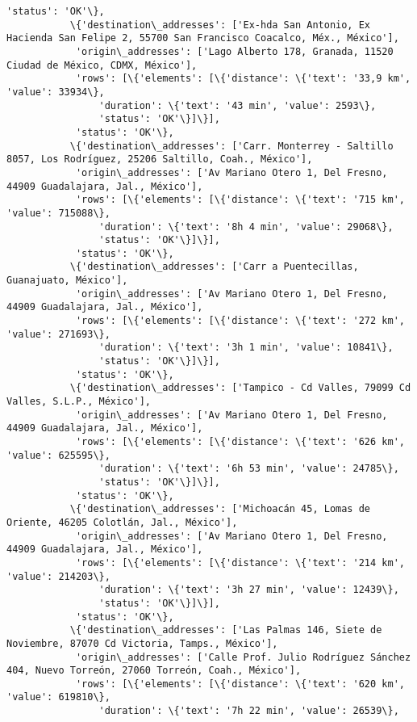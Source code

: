 \documentclass[11pt]{article}
\begin{document}
\begin{Verbatim}[commandchars=\\\{\}]
            'status': 'OK'\},
           \{'destination\_addresses': ['Ex-hda San Antonio, Ex Hacienda San Felipe 2, 55700 San Francisco Coacalco, Méx., México'],
            'origin\_addresses': ['Lago Alberto 178, Granada, 11520 Ciudad de México, CDMX, México'],
            'rows': [\{'elements': [\{'distance': \{'text': '33,9 km', 'value': 33934\},
                'duration': \{'text': '43 min', 'value': 2593\},
                'status': 'OK'\}]\}],
            'status': 'OK'\},
           \{'destination\_addresses': ['Carr. Monterrey - Saltillo 8057, Los Rodríguez, 25206 Saltillo, Coah., México'],
            'origin\_addresses': ['Av Mariano Otero 1, Del Fresno, 44909 Guadalajara, Jal., México'],
            'rows': [\{'elements': [\{'distance': \{'text': '715 km', 'value': 715088\},
                'duration': \{'text': '8h 4 min', 'value': 29068\},
                'status': 'OK'\}]\}],
            'status': 'OK'\},
           \{'destination\_addresses': ['Carr a Puentecillas, Guanajuato, México'],
            'origin\_addresses': ['Av Mariano Otero 1, Del Fresno, 44909 Guadalajara, Jal., México'],
            'rows': [\{'elements': [\{'distance': \{'text': '272 km', 'value': 271693\},
                'duration': \{'text': '3h 1 min', 'value': 10841\},
                'status': 'OK'\}]\}],
            'status': 'OK'\},
           \{'destination\_addresses': ['Tampico - Cd Valles, 79099 Cd Valles, S.L.P., México'],
            'origin\_addresses': ['Av Mariano Otero 1, Del Fresno, 44909 Guadalajara, Jal., México'],
            'rows': [\{'elements': [\{'distance': \{'text': '626 km', 'value': 625595\},
                'duration': \{'text': '6h 53 min', 'value': 24785\},
                'status': 'OK'\}]\}],
            'status': 'OK'\},
           \{'destination\_addresses': ['Michoacán 45, Lomas de Oriente, 46205 Colotlán, Jal., México'],
            'origin\_addresses': ['Av Mariano Otero 1, Del Fresno, 44909 Guadalajara, Jal., México'],
            'rows': [\{'elements': [\{'distance': \{'text': '214 km', 'value': 214203\},
                'duration': \{'text': '3h 27 min', 'value': 12439\},
                'status': 'OK'\}]\}],
            'status': 'OK'\},
           \{'destination\_addresses': ['Las Palmas 146, Siete de Noviembre, 87070 Cd Victoria, Tamps., México'],
            'origin\_addresses': ['Calle Prof. Julio Rodríguez Sánchez 404, Nuevo Torreón, 27060 Torreón, Coah., México'],
            'rows': [\{'elements': [\{'distance': \{'text': '620 km', 'value': 619810\},
                'duration': \{'text': '7h 22 min', 'value': 26539\},

\end{Verbatim}
\end{document}
